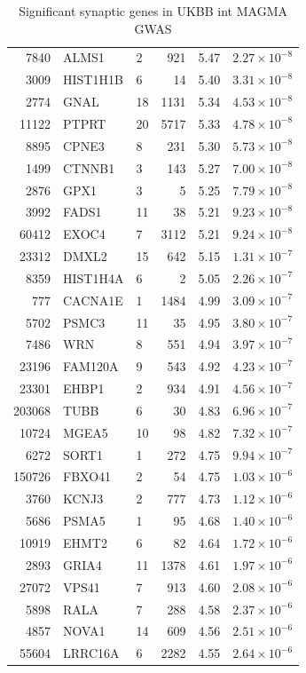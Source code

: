 \begin{table}[ht]
\begin{tabular}{rllrrr}
  7840 & ALMS1 & 2 & 921 & 5.47 & $2.27 \times 10^{-8}$ \\ 
  3009 & HIST1H1B & 6 &  14 & 5.40 & $3.31 \times 10^{-8}$ \\ 
  2774 & GNAL & 18 & 1131 & 5.34 & $4.53 \times 10^{-8}$ \\ 
  11122 & PTPRT & 20 & 5717 & 5.33 & $4.78 \times 10^{-8}$ \\ 
  8895 & CPNE3 & 8 & 231 & 5.30 & $5.73 \times 10^{-8}$ \\ 
  1499 & CTNNB1 & 3 & 143 & 5.27 & $7.00 \times 10^{-8}$ \\ 
  2876 & GPX1 & 3 &   5 & 5.25 & $7.79 \times 10^{-8}$ \\ 
  3992 & FADS1 & 11 &  38 & 5.21 & $9.23 \times 10^{-8}$ \\ 
  60412 & EXOC4 & 7 & 3112 & 5.21 & $9.24 \times 10^{-8}$ \\ 
  23312 & DMXL2 & 15 & 642 & 5.15 & $1.31 \times 10^{-7}$ \\ 
  8359 & HIST1H4A & 6 &   2 & 5.05 & $2.26 \times 10^{-7}$ \\ 
  777 & CACNA1E & 1 & 1484 & 4.99 & $3.09 \times 10^{-7}$ \\ 
  5702 & PSMC3 & 11 &  35 & 4.95 & $3.80 \times 10^{-7}$ \\ 
  7486 & WRN & 8 & 551 & 4.94 & $3.97 \times 10^{-7}$ \\ 
  23196 & FAM120A & 9 & 543 & 4.92 & $4.23 \times 10^{-7}$ \\ 
  23301 & EHBP1 & 2 & 934 & 4.91 & $4.56 \times 10^{-7}$ \\ 
  203068 & TUBB & 6 &  30 & 4.83 & $6.96 \times 10^{-7}$ \\ 
  10724 & MGEA5 & 10 &  98 & 4.82 & $7.32 \times 10^{-7}$ \\ 
  6272 & SORT1 & 1 & 272 & 4.75 & $9.94 \times 10^{-7}$ \\ 
  150726 & FBXO41 & 2 &  54 & 4.75 & $1.03 \times 10^{-6}$ \\ 
  3760 & KCNJ3 & 2 & 777 & 4.73 & $1.12 \times 10^{-6}$ \\ 
  5686 & PSMA5 & 1 &  95 & 4.68 & $1.40 \times 10^{-6}$ \\ 
  10919 & EHMT2 & 6 &  82 & 4.64 & $1.72 \times 10^{-6}$ \\ 
  2893 & GRIA4 & 11 & 1378 & 4.61 & $1.97 \times 10^{-6}$ \\ 
  27072 & VPS41 & 7 & 913 & 4.60 & $2.08 \times 10^{-6}$ \\ 
  5898 & RALA & 7 & 288 & 4.58 & $2.37 \times 10^{-6}$ \\ 
  4857 & NOVA1 & 14 & 609 & 4.56 & $2.51 \times 10^{-6}$ \\ 
  55604 & LRRC16A & 6 & 2282 & 4.55 & $2.64 \times 10^{-6}$ \\ 
   \hline
\end{tabular}
\caption{Significant synaptic genes in UKBB int  MAGMA GWAS} 
\label{tab:Significant synaptic genes in UKBB int  MAGMA GWAS}
\end{table}







